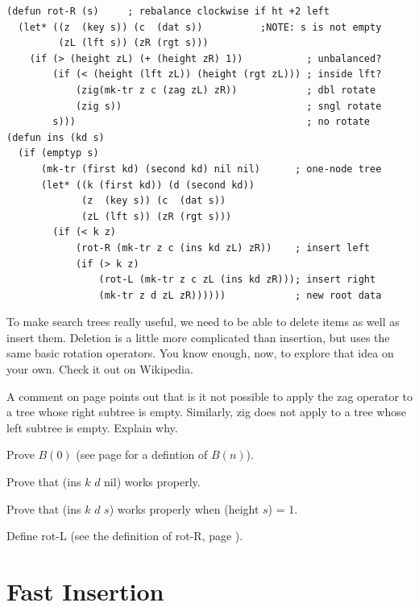 \begin{center}
\label{rot-R-defun}
\begin{Verbatim}
(defun rot-R (s)     ; rebalance clockwise if ht +2 left
  (let* ((z  (key s)) (c  (dat s))          ;NOTE: s is not empty
         (zL (lft s)) (zR (rgt s)))
    (if (> (height zL) (+ (height zR) 1))           ; unbalanced?
        (if (< (height (lft zL)) (height (rgt zL))) ; inside lft?
            (zig(mk-tr z c (zag zL) zR))            ; dbl rotate
            (zig s))                                ; sngl rotate
        s)))                                        ; no rotate
(defun ins (kd s)
  (if (emptyp s)
      (mk-tr (first kd) (second kd) nil nil)      ; one-node tree
      (let* ((k (first kd)) (d (second kd))
             (z  (key s)) (c  (dat s))
             (zL (lft s)) (zR (rgt s)))
        (if (< k z)
            (rot-R (mk-tr z c (ins kd zL) zR))    ; insert left
            (if (> k z)
                (rot-L (mk-tr z c zL (ins kd zR))); insert right
                (mk-tr z d zL zR))))))            ; new root data
\end{Verbatim}
\end{center}

To make search trees really useful, we need to be able to delete items
as well as insert them.
Deletion is a little more complicated than
insertion, but uses the same basic rotation operators.
You know enough, now, to explore that idea on your own.
Check it out on Wikipedia.

\begin{ExerciseList}
\Exercise A comment on page \pageref{no-zag} points out
that is it not possible to apply the zag operator to
a tree whose right subtree is empty.
Similarly, zig does not apply to a tree whose left subtree is empty.
Explain why.

\Exercise Prove $B(0)$ (see page \pageref{ins-induction-predicate} for a defintion of $B(n)$).

\Exercise Prove that (ins $k$ $d$ nil) works properly.

\Exercise Prove that (ins $k$ $d$ $s$) works properly when (height $s$) = 1.

\Exercise Define rot-L \label{rot-L-defun}
(see the definition of rot-R, page \pageref{rot-R-defun}).

\end{ExerciseList}

\section{Fast Insertion}


